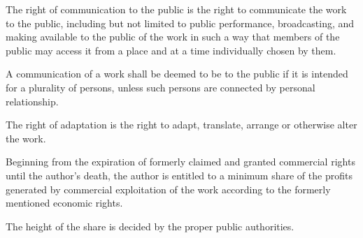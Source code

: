 \begin{contract}
\label{Par:RightOfCommunicationToThePublic}
\Sentence  The right of communication to the public is the right to communicate the 
work to the public, including but not limited to public performance, 
broadcasting, and making available to the public of the work in such a 
way that members of the public may access it from a place and at a time 
individually chosen by them.

\Sentence  A communication of a work shall be deemed to be to the public if it is 
intended for a plurality of persons, unless such persons are connected by 
personal relationship.

\label{Par:RightOfAdaption}
\Sentence The right of adaptation is the right to adapt, translate, arrange or otherwise 
alter the work.

\label{Par:SubsequentExploitation}
\Sentence Beginning from the expiration of formerly claimed and granted commercial rights until the author's death, the author is entitled to a minimum share of the profits generated by commercial exploitation of the work according to the formerly mentioned economic rights.

\Sentence The height of the share is decided by the proper public authorities.

\end{contract}